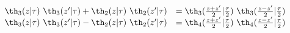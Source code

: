 \begin{equation}
    \begin{array}{ll}
       \th_3(z|\tau)~\th_3(z'|\tau) + \th_2(z|\tau)~\th_2(z'|\tau)&=
       \th_3({z+z'\over 2}|{\tau\over 2})~\th_3({z-z'\over 2}|{\tau\over 2}) \\
       \th_3(z|\tau)~\th_3(z'|\tau) - \th_2(z|\tau)~\th_2(z'|\tau)&=
       \th_4({z+z'\over 2}|{\tau\over 2})~\th_4({z-z'\over 2}|{\tau\over 2})
    \end{array}
  \end{equation}

